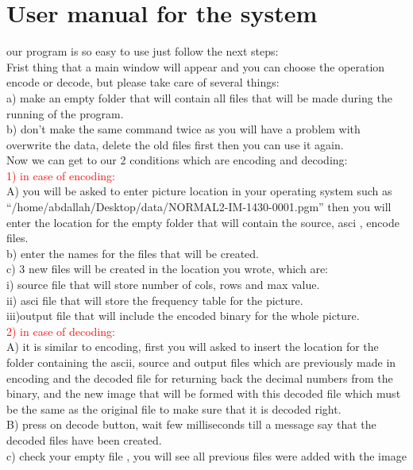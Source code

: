 \documentclass[11 pt,twocolumn,letterpaper]{article}
\begin{document}
\section{User manual for the system} 
our program is so easy to use just follow the next steps:\\
 Frist thing that a main window will appear and you can choose the operation encode or decode, but please take care of several things:\\
a) make an empty folder that will contain all files that will be made during the running of the program.\\
b) don’t make the same command twice as you will have a problem with overwrite the data, delete the old files first then you can use it again.\\
Now we can get to our 2 conditions which are encoding and decoding:\\
\textcolor{red}{1) in case of encoding:}\\
A) you will be asked to enter picture location in your operating system such as “/home/abdallah/Desktop/data/NORMAL2-IM-1430-0001.pgm”  then you will enter the location for the empty folder that will contain the source, asci ,  encode files.\\
b) enter the names for the files that will be created.\\
c) 3 new files will be created in the location you wrote, which are:\\
i) source file that will store number of cols, rows and max value.\\
ii) asci file that will store the frequency table for the picture.\\
iii)output file that will include the encoded binary for the whole picture.\\
\textcolor{red}{2) in case of decoding:}\\
A) it is similar to encoding, first you will asked to insert the location for the folder containing the ascii, source and output files which are previously made in encoding and the decoded file for returning back the decimal numbers from the binary, and the new image that will be formed with this decoded file which must be the same as the original file to make sure that it is decoded right.\\
B) press on decode button, wait few milliseconds till a message say that the decoded files have been created.\\
c) check your empty file , you will see all previous files were added with the image\\
\end{document}
